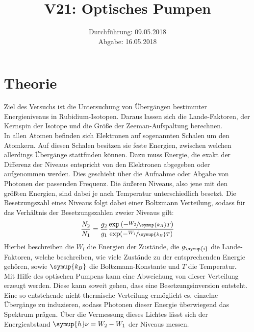 \documentclass[
  bibliography=totoc,     %
  captions=tableheading,  %
  titlepage=firstiscover, %
]{scrartcl}
\title{V21: Optisches Pumpen}
\author{
  Simon Schulte
  \texorpdfstring{
    \\
    \href{mailto:simon.schulte@udo.edu}{simon.schulte@udo.edu}
  }{}
  \texorpdfstring{\and}{, }
  Tim Sedlaczek
  \texorpdfstring{
    \\
    \href{mailto:tim.sedlaczek@udo.edu}{tim.sedlaczek@udo.edu}
  }{}
}
\date{Durchführung: 09.05.2018\\
      Abgabe: 16.05.2018}
\begin{document}
\maketitle
\thispagestyle{empty}
\setcounter{page}{1}
\section{Theorie}
\label{sec:theorie}
Ziel des Versuchs ist die Untersuchung von Übergängen bestimmter
Energieniveaus in Rubidium-Isotopen. Daraus lassen sich die Lande-Faktoren,
der Kernspin der Isotope und die Größe der Zeeman-Aufspaltung berechnen. \\
In allen Atomen befinden sich Elektronen auf sogenannten Schalen um den
Atomkern. Auf diesen Schalen besitzen sie feste Energien, zwischen welchen
allerdings Übergänge stattfinden können. Dazu muss Energie, die exakt der
Differenz der Niveaus entspricht von den Elektronen abgegeben oder aufgenommen
werden. Dies geschieht über die Aufnahme oder Abgabe von Photonen der
passenden Frequenz. Die äußeren Niveaus, also jene mit den größten Energien,
sind dabei je nach Temperatur unterschiedlich besetzt. Die Besetzungszahl eines
Niveaus folgt dabei einer Boltzmann Verteilung, sodass für das Verhältnis der
Besetzungszahlen zweier Niveaus gilt:
%
\begin{equation}
  \frac{N_2}{N_1}=\frac{g_2}{g_1}\frac{\exp\left(-\sfrac{W_2}{\symup{k_B}T}\right)}{\exp(-\sfrac{W_1}{\symup{k_B}T})}
\end{equation}
%
Hierbei beschreiben die $W_i$ die Energien der Zustände, die $g_{\symup{i}}$ die
Lande-Faktoren, welche beschreiben, wie viele Zustände zu der entsprechenden
Energie gehören, sowie $\symup{k_B}$ die Boltzmann-Konstante und $T$ die
Temperatur. \\
Mit Hilfe des optischen Pumpens kann eine Abweichung von dieser Verteilung
erzeugt werden. Diese kann soweit gehen, dass eine Besetzungsinversion
entsteht. Eine so entstehende nicht-thermische Verteilung ermöglicht es,
einzelne Übergänge zu induzieren, sodass Photonen dieser Energie überwiegend
das Spektrum prägen. Über die Vermessung dieses Lichtes lässt sich der
Energieabstand $\symup{h}\nu=W_2-W_1$ der Niveaus messen.
\end{document}
